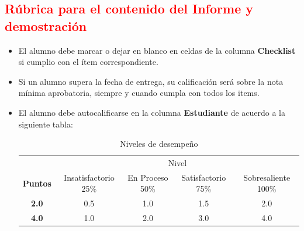 \documentclass{article}
\begin{document}
\subsection{\textcolor{red}{Rúbrica para el contenido del Informe y demostración}}
\begin{itemize}
	\item El alumno debe marcar o dejar en blanco en celdas de la columna \textbf{Checklist} si cumplio con el ítem correspondiente.
	\item Si un alumno supera la fecha de entrega, su calificación será sobre la nota mínima aprobatoria, siempre y cuando cumpla con todos los items.
	\item El alumno debe autocalificarse en la columna \textbf{Estudiante} de acuerdo a la siguiente tabla:

	      \begin{table}[ht]
		      \caption{Niveles de desempeño}
		      \begin{center}
			      \begin{tabular}{ccccc}
				      \hline
				                      & \multicolumn{4}{c}{Nivel}                                                              \\
				      \cline{1-5}
				      \textbf{Puntos} & Insatisfactorio 25\%      & En Proceso 50\% & Satisfactorio 75\% & Sobresaliente 100\% \\
				      \textbf{2.0}    & 0.5                       & 1.0             & 1.5                & 2.0                 \\
				      \textbf{4.0}    & 1.0                       & 2.0             & 3.0                & 4.0                 \\
				      \hline
			      \end{tabular}
		      \end{center}
	      \end{table}

\end{itemize}
\end{document}

